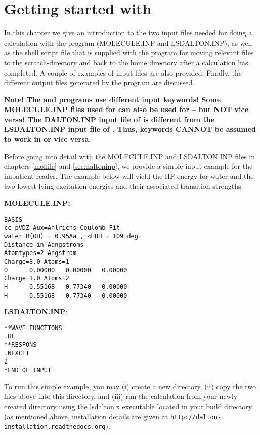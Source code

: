 \chapter{Getting started with {\lsdalton}}\label{ch:starting}

In this chapter we give an introduction to the two input files needed
for doing a calculation with the {\lsdalton} program
(MOLECULE.INP and LSDALTON.INP), as well as the
shell script file that is supplied with the program for moving
relevant files to the scratch-directory and back to the home directory
after a calculation has completed. A couple of examples of
input files  are also provided. Finally, the different output files
generated by the program are discussed.

\textbf{Note! The {\dalton} and {\lsdalton} programs use different input keywords! Some MOLECULE.INP files used for {\lsdalton} can also be used for 
 {\dalton} -- but NOT vice versa! The DALTON.INP input file of  {\dalton} is different from the LSDALTON.INP input file of {\lsdalton}.
Thus, {\dalton} keywords CANNOT be assumed to work in {\lsdalton} or vice versa.}

Before going into detail with the 
MOLECULE.INP and LSDALTON.INP files in chapters \ref{molfile} and \ref{sec:daltoninp},
we provide a simple input example for the impatient reader. The example below
will yield the HF energy for water and the
two lowest lying excitation energies and their associated transition strengths:

\vspace{1 cm}

{\noindent \textbf{MOLECULE.INP:}}
\begin{verbatim}
BASIS
cc-pVDZ Aux=Ahlrichs-Coulomb-Fit
water R(OH) = 0.95Aa , <HOH = 109 deg.
Distance in Aangstroms
Atomtypes=2 Angstrom
Charge=8.0 Atoms=1
O      0.00000   0.00000   0.00000
Charge=1.0 Atoms=2
H      0.55168   0.77340   0.00000
H      0.55168  -0.77340   0.00000
\end{verbatim} 

\vspace{1 cm}

{\noindent \textbf{LSDALTON.INP}:}
\begin{verbatim}
**WAVE FUNCTIONS
.HF
**RESPONS
.NEXCIT
2
*END OF INPUT
\end{verbatim}

To run this simple example, you may (i) create a new directory, (ii) copy the two files above into this directory,
and (iii) run the calculation from your newly created directory using the lsdalton.x executable located in your build directory (as mentioned above, installation details are given at 
\verb|http://dalton-installation.readthedocs.org|).

